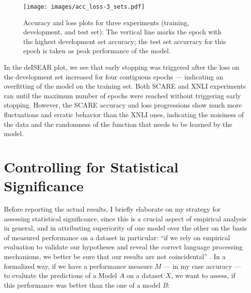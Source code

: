 \begin{figure}[H]
  \begin{center}
    \texttt{[image: images/acc\_loss-3\_sets.pdf]}
  \end{center}
  \caption[Accuracy/Loss plots of three experiments]{Accuracy and loss plots for three
experiments (\textcolor{std-blue}{training}, \textcolor{std-red}{development}, and
\textcolor{std-green}{test} set): The vertical line marks the epoch with the highest
development set accuracy; the test set accurracy for this epoch is taken as peak performance
of the model.}
  \label{fig:acc-loss}
\end{figure}

In the deISEAR plot, we see that early stopping
was triggered after the loss on the development set increased for four contiguous
epochs --- indicating an overfitting of the model on the training set. Both SCARE
and XNLI experiments ran until the maximum number of epochs were reached without
triggering early stopping. However, the SCARE accuracy and loss progressions show
much more fluctuations and erratic behavior than the XNLI ones, indicating the
noisiness of the data and the randomness of the function that needs to be learned
by the model.




\section{Controlling for Statistical Significance}

Before reporting the actual results, I briefly elaborate on my strategy for
assessing statistical significance, since this is a crucial aspect of empirical
analysis in general, and in attributing superiority of one model over the other
on the basis of measured performance on a dataset in particular:
``if we rely on empirical evaluation to validate our hypotheses and reveal the
correct language processing mechanisms, we better be sure that our results are
not coincidental'' \citep{dror2018hitchhiker}. In a formalized way, if we have a
performance measure $M$ --- in my case accuracy --- to evaluate the predictions
of a Model $A$ on a dataset $X$, we want to assess, if this performance was better
than the one of a model $B$:

